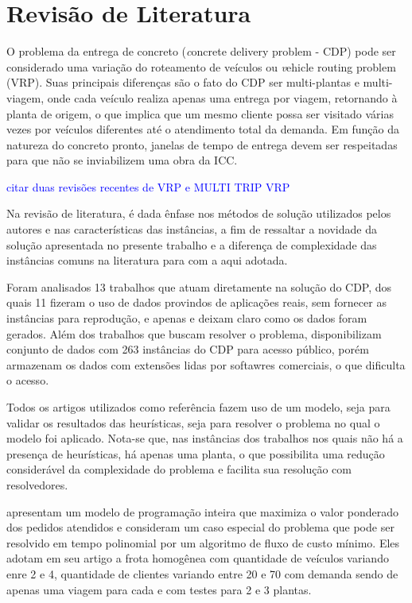 \chapter{Revisão de Literatura}
O problema da entrega de concreto ({\textit concrete delivery problem} - CDP) pode ser considerado uma variação do roteamento de veículos ou {\textit vehicle routing problem} (VRP). Suas principais diferenças são o fato do CDP ser multi-plantas e multi-viagem, onde cada veículo
realiza apenas uma entrega  por viagem, retornando à planta de origem,
o que implica que um mesmo cliente possa ser visitado várias vezes
por veículos diferentes até o atendimento total da demanda.
Em função da natureza do concreto pronto, janelas de tempo de entrega
devem ser respeitadas para que não se inviabilizem uma obra da ICC.

\textcolor{blue}{citar duas revisões recentes de VRP e MULTI TRIP VRP}

Na revisão de literatura, é dada ênfase nos métodos de solução utilizados pelos autores e nas características das instâncias, a fim de ressaltar a novidade da solução apresentada no presente trabalho e a diferença de complexidade das instâncias comuns na literatura para com a aqui adotada.

Foram analisados 13 trabalhos que atuam diretamente na solução do CDP, dos quais 11 fizeram o uso de dados provindos de aplicações reais, sem fornecer as instâncias para reprodução, e apenas \cite{tabref1}  e \cite{tabref9} deixam claro como os dados foram gerados. Além dos trabalhos que buscam resolver o problema, \cite{dados} disponibilizam conjunto de dados com 263 instâncias do CDP para acesso público, porém armazenam os dados com extensões lidas por softawres comerciais, o que dificulta o acesso. 

Todos os artigos utilizados como referência fazem uso de um modelo, seja para validar os resultados das heurísticas, seja para resolver o problema no qual o modelo foi aplicado. Nota-se que, nas instâncias dos trabalhos nos quais não há a presença de heurísticas, há apenas uma planta, o que possibilita uma redução considerável da complexidade do problema e facilita sua resolução com resolvedores. 

\cite{tabref1} apresentam um modelo de programação inteira que maximiza o valor ponderado dos pedidos atendidos e consideram um caso especial do problema que pode ser resolvido em tempo polinomial por um algoritmo de fluxo de custo mínimo. Eles adotam em seu artigo a frota homogênea com quantidade de veículos variando enre 2 e 4, quantidade de clientes variando entre 20 e 70 com demanda sendo de apenas uma viagem para cada e com testes para 2 e 3 plantas.  

